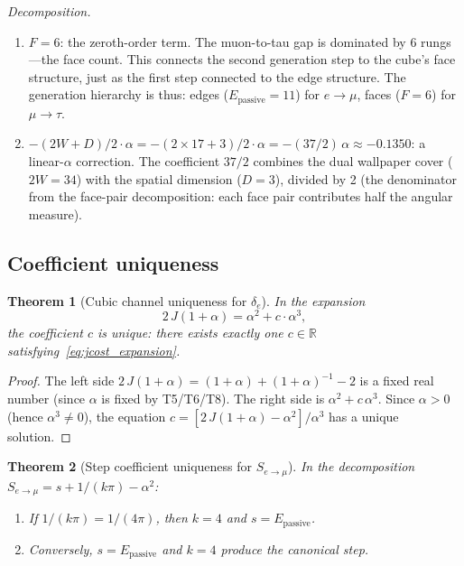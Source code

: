 \documentclass[11pt,a4paper]{article}
\newtheorem{theorem}{Theorem}[section]
\theoremstyle{definition}
\theoremstyle{remark}
\newcommand{\Jcost}{J}
\newcommand{\Epass}{E_{\mathrm{passive}}}
\begin{document}
\noindent\textit{Decomposition.}

\begin{enumerate}[nosep]
  \item $F = 6$: the zeroth-order term.  The muon-to-tau gap is dominated by
    6 rungs---the face count.  This connects the second generation step to the
    cube's face structure, just as the first step connected to the edge
    structure.  The generation hierarchy is thus: edges ($\Epass = 11$) for
    $e \to \mu$, faces ($F = 6$) for $\mu \to \tau$.

  \item $-(2W + D)/2 \cdot \alpha = -(2 \times 17 + 3)/2 \cdot \alpha
    = -(37/2)\,\alpha \approx -0.1350$: a linear-$\alpha$ correction.
    The coefficient $37/2$ combines the dual wallpaper cover ($2W = 34$)
    with the spatial dimension ($D = 3$), divided by 2 (the denominator
    from the face-pair decomposition: each face pair contributes half the
    angular measure).
\end{enumerate}

\subsection{Coefficient uniqueness}

\begin{theorem}[Cubic channel uniqueness for $\delta_e$]
\label{thm:cubic_coeff_unique}
In the expansion
\begin{equation}
  2\,\Jcost(1 + \alpha) = \alpha^2 + c \cdot \alpha^3,
  \label{eq:jcost_expansion}
\end{equation}
the coefficient $c$ is unique: there exists exactly one $c \in \mathbb{R}$
satisfying~\eqref{eq:jcost_expansion}.
\end{theorem}

\begin{proof}
The left side $2\,\Jcost(1 + \alpha) = (1+\alpha) + (1+\alpha)^{-1} - 2$
is a fixed real number (since $\alpha$ is fixed by T5/T6/T8).
The right side is $\alpha^2 + c\,\alpha^3$.  Since $\alpha > 0$ (hence
$\alpha^3 \neq 0$), the equation
$c = [2\,\Jcost(1+\alpha) - \alpha^2]/\alpha^3$
has a unique solution.
\end{proof}

\begin{theorem}[Step coefficient uniqueness for $S_{e \to \mu}$]
\label{thm:step_emu_unique}
In the decomposition $S_{e\to\mu} = s + 1/(k\pi) - \alpha^2$:
\begin{enumerate}[nosep,label=(\roman*)]
  \item If $1/(k\pi) = 1/(4\pi)$, then $k = 4$ and
        $s = \Epass$.
  \item Conversely, $s = \Epass$ and $k = 4$ produce the canonical step.
\end{enumerate}
\end{theorem}
\end{document}
